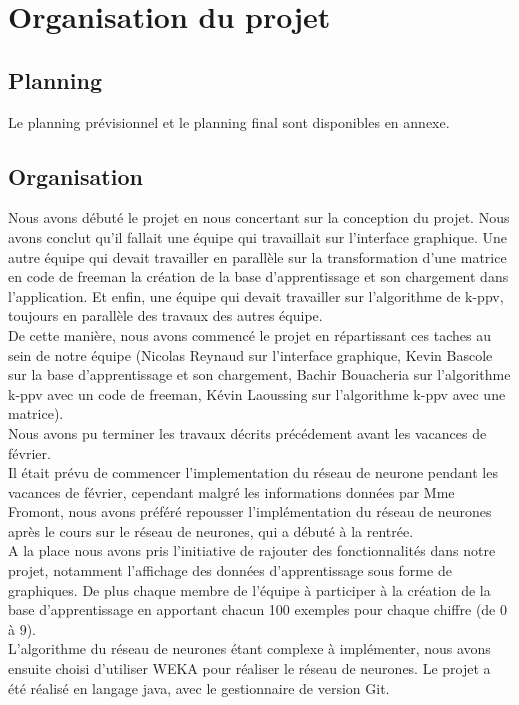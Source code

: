 \documentclass[10pt,a4paper]{report}
\begin{document}

\section{Organisation du projet}

\subsection{Planning}
\begin{flushleft}
Le planning prévisionnel et le planning final sont disponibles en annexe.
\end{flushleft}

\subsection{Organisation}

\begin{flushleft}
Nous avons débuté le projet en nous concertant sur la conception du projet. Nous avons conclut qu'il fallait une équipe qui travaillait sur l'interface graphique. Une autre équipe qui devait travailler en parallèle sur la transformation d'une matrice en code de freeman la création de la base d'apprentissage et son chargement dans l'application. Et enfin, une équipe qui devait travailler sur l'algorithme de k-ppv, toujours en parallèle des travaux des autres équipe.\\
De cette manière, nous avons commencé le projet en répartissant ces taches au sein de notre équipe (Nicolas Reynaud sur l'interface graphique, Kevin Bascole sur la base d'apprentissage et son chargement, Bachir Bouacheria sur l'algorithme k-ppv avec un code de freeman, Kévin Laoussing sur l'algorithme k-ppv avec une matrice).\\
Nous avons pu terminer les travaux décrits précédement avant les vacances de février.\\ 
Il était prévu de commencer l'implementation du réseau de neurone pendant les vacances de février, cependant malgré les informations données par Mme Fromont, nous avons préféré repousser l'implémentation du réseau de neurones après le cours sur le réseau de neurones, qui a débuté à la rentrée.\\
A la place nous avons pris l'initiative de rajouter des fonctionnalités dans notre projet, notamment l'affichage des données d'apprentissage sous forme de graphiques. De plus chaque membre de l'équipe à participer à la création de la base d'apprentissage en apportant chacun 100 exemples pour chaque chiffre (de 0 à 9).\\
L'algorithme du réseau de neurones étant complexe à implémenter,
nous avons ensuite choisi d'utiliser WEKA pour réaliser le réseau de neurones.
Le projet a été réalisé en langage java, avec le gestionnaire de version Git.
\end{flushleft}
\end{document}
